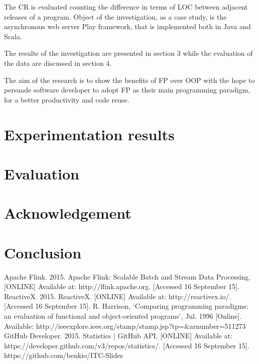 \documentclass{proc}
\begin{document}
The CR is evaluated counting the difference in terms of LOC between adjacent releases of a program. Object of the investigation, as a case study, is the asynchronous web server Play framework, that is implemented both in Java and Scala.

The results of the investigation are presented in section 3 while the evaluation of the data are discussed in section 4.

The aim of the research is to show the benefits of FP over OOP with the hope to persuade software developer to adopt FP as their main programming paradigm, for a better productivity and code reuse. 

\section{Experimentation results}

\section{Evaluation}

\section{Acknowledgement}

\section{Conclusion}

\begin{thebibliography}{9}
Apache Flink. 2015. Apache Flink: Scalable Batch and Stream Data Processing. [ONLINE] Available at: http://flink.apache.org. [Accessed 16 September 15].
ReactiveX. 2015. ReactiveX. [ONLINE] Available at: http://reactivex.io/. [Accessed 16 September 15].
R. Harrison, \enquote*{Comparing programming paradigms: an evaluation of functional and object-oriented programs}, Jul. 1996 [Online]. Available: http://ieeexplore.ieee.org/stamp/stamp.jsp?tp=\&arnumber=511273
GitHub Developer. 2015. Statistics | GitHub API. [ONLINE] Available at: https://developer.github.com/v3/repos/statistics/. [Accessed 16 September 15].
https://github.com/benkio/ITC-Slides
\end{thebibliography}
\end{document}
